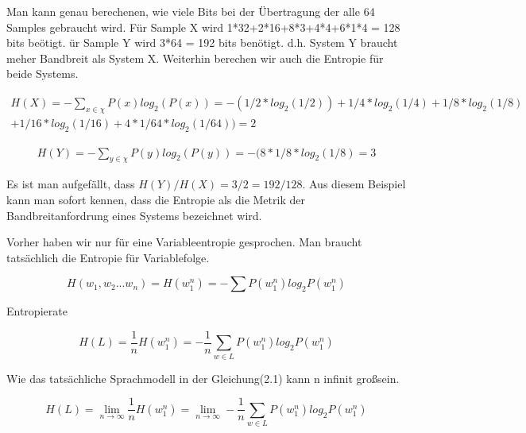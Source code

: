 Man kann genau berechenen, wie viele Bits bei der \"Ubertragung der alle 64 Samples gebraucht wird. F\"ur Sample X wird 1*32+2*16+8*3+4*4+6*1*4 = 128 bits be\"otigt. \"ur Sample Y wird 3*64 = 192 bits ben\"otigt. d.h. System Y braucht meher Bandbreit als System X. Weiterhin berechen wir auch die Entropie f\"ur beide Systems.

\begin{multline}
H(X)=-\sum_{x\in\chi}P(x)log_{2}(P(x))=-(1/2*log_{2}(1/2))+1/4*log_{2}(1/4)+1/8*log_{2}(1/8)\\
+1/16*log_{2}(1/16)+4*1/64*log_{2}(1/64))=2
\end{multline}

\begin{multline}
H(Y)=-\sum_{y\in\chi}P(y)log_{2}(P(y))=-(8*1/8*log_{2}(1/8)=3
\end{multline}

Es ist man aufgef\"allt, dass $H(Y)/H(X)=3/2=192/128$. Aus diesem Beispiel kann man sofort kennen, dass die Entropie als die Metrik der Bandbreitanfordrung eines Systems bezeichnet wird.
   
Vorher haben wir nur f\"ur eine Variableentropie gesprochen. Man braucht tats\"achlich die Entropie f\"ur Variablefolge.

\begin{equation}
H(w_{1},w_{2}...w_{n})=H(w_{1}^{n})=-\sum{P(w_{1}^{n})log_{2}P(w_{1}^{n})}
\end{equation}

Entropierate

\begin{equation}
H(L)=\frac{1}{n}H(w_{1}^{n})=-\frac{1}{n}\sum_{w\in L}P(w_{1}^{n})log_{2}P(w_{1}^{n})
\end{equation}

Wie das tats\"achliche Sprachmodell in der Gleichung(2.1) kann n infinit gro\ss sein.

\begin{equation}
H(L)=\lim_{n\to\infty}\frac{1}{n}H(w_{1}^{n})=\lim_{n\to\infty}-\frac{1}{n}\sum_{w\in L}P(w_{1}^{n})log_{2}P(w_{1}^{n})
\end{equation}